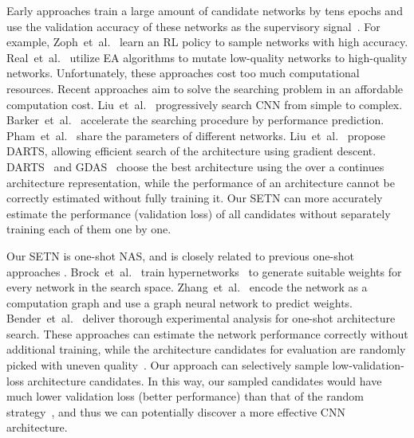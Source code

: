 \documentclass[10pt,twocolumn,letterpaper]{article}
\def\NAME{{SETN}}
\begin{document}
Early approaches train a large amount of candidate networks by tens epochs and use the validation accuracy of these networks as the supervisory signal~\cite{liu2018hierarchical,real2019regularized,zoph2017NAS,Zoph_2018_CVPR,real2017large}.
For example, Zoph~et~al.~\cite{zoph2017NAS,Zoph_2018_CVPR} learn an RL policy to sample networks with high accuracy.
Real~et~al.~\cite{real2017large,real2019regularized} utilize EA algorithms to mutate low-quality networks to high-quality networks.
Unfortunately, these approaches cost too much computational resources.
Recent approaches aim to solve the searching problem in an affordable computation cost.
Liu~et~al.~\cite{Liu_2018_ECCV} progressively search CNN from simple to complex. Barker~et~al.~\cite{baker2018accelerating} accelerate the searching procedure by performance prediction. Pham~et~al.~\cite{pmlr-v80-pham18a} share the parameters of different networks.
Liu~et~al.~\cite{liu2019darts} propose DARTS, allowing efficient search of the architecture using gradient descent.
DARTS~\cite{liu2019darts} and GDAS~\cite{dong2019search} choose the best architecture using the  over a continues architecture representation, while the performance of an architecture cannot be correctly estimated without fully training it.
Our {\NAME} can more accurately estimate the performance (validation loss) of all candidates without separately training each of them one by one. 




Our {\NAME} is one-shot NAS, and is closely related to previous one-shot approaches \cite{zhang2019graph,bender2018understanding,brock2018smash}.
Brock~et~al.~\cite{brock2018smash} train hypernetworks~\cite{ha2017hypernetworks} to generate suitable weights for every network in the search space. Zhang~et~al.~\cite{zhang2019graph} encode the network as a computation graph and use a graph neural network to predict weights.
Bender~et~al.~\cite{bender2018understanding} deliver thorough experimental analysis for one-shot architecture search.
These approaches can estimate the network performance correctly without additional training, while the architecture candidates for evaluation are randomly picked with uneven quality~\cite{bender2018understanding,brock2018smash}.
Our approach can selectively sample low-validation-loss architecture candidates.
In this way, our sampled candidates would have much lower validation loss (better performance) than that of the random strategy~\cite{bender2018understanding,brock2018smash}, and thus we can potentially discover a more effective CNN architecture.
\end{document}
